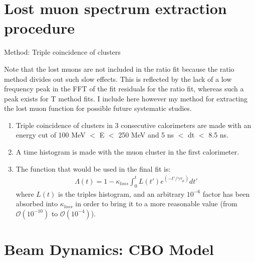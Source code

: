 \section{Lost muon spectrum extraction procedure}

Method: Triple coincidence of clusters

Note that the lost muons are not included in the ratio fit because the ratio method divides out such slow effects. This is reflected by the lack of a low frequency peak in the FFT of the fit residuals for the ratio fit, whereas such a peak exists for T method fits. I include here however my method for extracting the lost muon function for possible future systematic studies.

\begin{enumerate}
	\item{Triple coincidence of clusters in 3 consecutive calorimeters are made with an energy cut of 100 MeV $<$ E $<$ 250 MeV and 5 ns $<$ dt $<$ 8.5 ns.}
	\item{A time histogram is made with the muon cluster in the first calorimeter.}
	\item{The function that would be used in the final fit is:
		\begin{gather}
			\Lambda(t) = 1 - \kappa_{loss} \int_{0}^{t} L(t')e^{(-t'/\gamma\tau_{\mu})} dt'
		\end{gather}
	where $L(t)$ is the triples histogram, and an arbitrary $10^{-6}$ factor has been absorbed into $\kappa_{loss}$ in order to bring it to a more reasonable value (from $\mathcal{O}(10^{-10})$ to $\mathcal{O}(10^{-4})$).}
\end{enumerate}


\section{Beam Dynamics: CBO Model}

